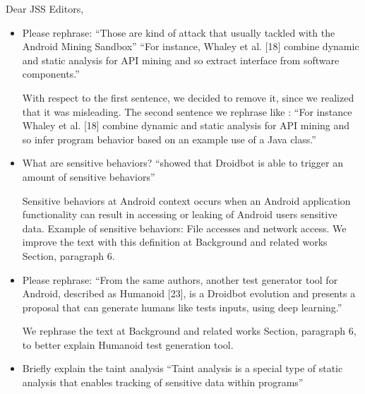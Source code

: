 \documentclass[12pt,english]{scrlttr2}
\begin{document}
\begin{letter}{Dear JSS Editors,}
\begin{itemize}
\vspace{0.2cm}

\item Please rephrase:
``Those are kind of attack that usually tackled with the Android Mining Sandbox''
``For instance, Whaley et al. [18] combine dynamic and static analysis for API mining and so extract interface from software components.''


\vspace{0.2cm}

{\color{blue}{\bf Answer.} With respect to the first sentence, we decided to remove it, since we realized that it was misleading. The second sentence we rephrase like : ``For instance Whaley et al. [18] combine dynamic and static analysis for API mining and so infer program behavior based on an example use of a Java class.''}

\vspace{0.2cm}

\item What are sensitive behaviors? ``showed that Droidbot is able to trigger an amount of sensitive behaviors''


\vspace{0.2cm}

{\color{blue}{\bf Answer.} Sensitive behaviors at Android context occurs when  an Android application functionality can result in accessing or leaking of Android users sensitive data. Example of sensitive behaviors: File accesses and network access. We improve the text with this definition at Background and related works Section, paragraph 6.}

\vspace{0.2cm}

\item Please rephrase:
``From the same authors, another test generator tool for Android, described as Humanoid [23], is a Droidbot evolution and
presents a proposal that can generate humans like tests inputs, using deep learning.''


\vspace{0.2cm}

{\color{blue}{\bf Answer.} We rephrase the text at Background and related works Section, paragraph 6, to better explain Humanoid test generation tool.}

\vspace{0.2cm}

\item Briefly explain the taint analysis
``Taint analysis is a special type of static analysis that enables tracking of sensitive data within programs''



\end{itemize}
\end{letter}
\end{document}
